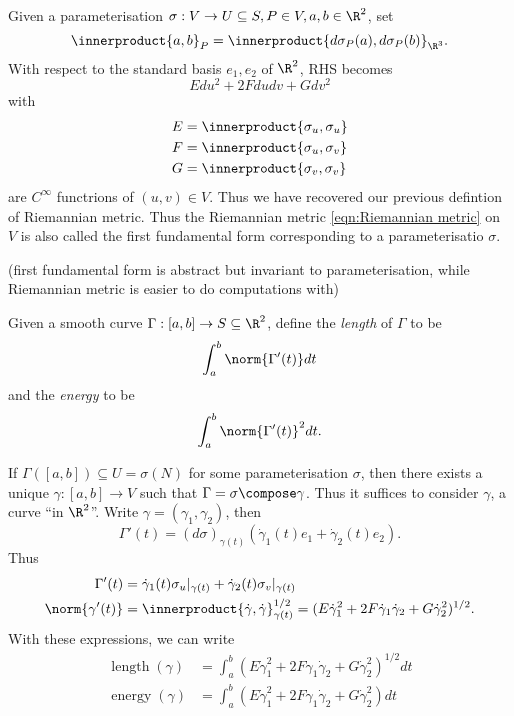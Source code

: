 \documentclass[a4paper]{article}
\theoremstyle{definition}
\newcommand*{\inner}{\innerproduct}
\begin{document}
Given a parameterisation \(\sigma: V \to U \subseteq S, P \in V, a, b \in \R^2\), set
\[
  \inner{a, b}_P = \inner{d\sigma_P(a), d\sigma_P(b)}_{\R^3}.
\]
With respect to the standard basis \(e_1, e_2\) of \(\R^2\), RHS becomes
\begin{equation}
  \label{eqn:Riemmanian metric}
  Edu^2 + 2Fdudv + Gdv^2
  \tag{\(\ast\)}
\end{equation}
with
\begin{align*}
  E &= \inner{\sigma_u, \sigma_u} \\
  F &= \inner{\sigma_u, \sigma_v} \\
  G &= \inner{\sigma_v, \sigma_v}
\end{align*}
are \(C^\infty\) functrions of \((u, v) \in V\). Thus we have recovered our previous defintion of Riemannian metric. Thus the Riemannian metric \eqref{eqn:Riemannian metric} on \(V\) is also called the first fundamental form corresponding to a parameterisatio \(\sigma\).

(first fundamental form is abstract but invariant to parameterisation, while Riemannian metric is easier to do computations with)

\begin{definition}
  Given a smooth curve \(\Gamma: [a, b] \to S \subseteq \R^2\), define the \emph{length} of \(\Gamma\) to be
  \[
    \int_a^b \norm{\Gamma'(t)} dt
  \]
  and the \emph{energy} to be
  \[
    \int_a^b \norm{\Gamma'(t)}^2 dt.
  \]
\end{definition}

If \(\Gamma([a, b]) \subseteq U = \sigma(N)\) for some parameterisation \(\sigma\), then there exists a unique \(\gamma: [a, b] \to V\) such that \(\Gamma = \sigma \compose \gamma\). Thus it suffices to consider \(\gamma\), a curve ``in \(\R^2\)''. Write \(\gamma = (\gamma_1, \gamma_2)\), then
\[
  \Gamma'(t) = (d\sigma)_{\gamma(t)} (\dot \gamma_1(t)e_1 + \dot \gamma_2(t)e_2).
\]
Thus
\begin{align*}
  \Gamma'(t) &= \dot \gamma_1(t) \sigma_u|_{\gamma(t)} + \dot \gamma_2(t) \sigma_v|_{\gamma(t)} \\
  \norm{\gamma'(t)} &= \inner{\dot \gamma, \dot \gamma}^{1/2}_{\gamma(t)} = (E \dot \gamma_1^2 + 2F \dot \gamma_1 \dot \gamma_2 + G \dot \gamma_2^2)^{1/2}.
\end{align*}
With these expressions, we can write
\begin{align*}
  \operatorname{length}(\gamma) &= \int_a^b (E \dot \gamma_1^2 + 2F \dot \gamma_1 \dot \gamma_2 + G \dot \gamma_2^2)^{1/2} dt \\
  \operatorname{energy}(\gamma) &= \int_a^b (E \dot \gamma_1^2 + 2F \dot \gamma_1 \dot \gamma_2 + G \dot \gamma_2^2) dt
\end{align*}
\end{document}
